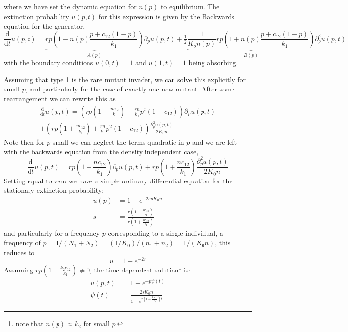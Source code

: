 \documentclass[authoryear,review,11pt]{elsarticle}
\newcommand{\ud}{\mathrm{d}}
\begin{document}
where we have set the dynamic equation for $n(p)$ to equilibrium.  The extinction probability $u(p,t)$ for this expression is given by the Backwards equation for the generator,
\begin{equation}
\frac{\ud}{\ud t} u(p,t) = \underbrace{r p \left(1 -  n(p) \frac{p + c_{12}(1-p) }{k_1 } \right)}_{A(p)} \partial_p u(p,t) + \tfrac{1}{2} \underbrace{\frac{1}{K_o n(p) } r p \left(1 +  n(p)\frac{p + c_{12} (1-p) }{k_1 } \right)}_{B(p)} \partial_p^2 u(p,t) 
\label{u}
\end{equation}
with the boundary conditions $u(0,t) = 1$ and $u(1,t) = 1$ being absorbing.  



Assuming that type 1 is the rare mutant invader, we can solve this explicitly for small $p$, and particularly for the case of exactly one new mutant.  After some rearrangement we can rewrite this as 
\begin{multline}
\frac{\ud}{\ud t} u(p,t) = \left( rp \left( 1-\frac{n c_{12}}{k_1} \right) - \frac{r n}{k_1} p^2 (1 - c_{12} )\right)  \partial_p u(p,t) \\
+ \left( rp \left(1+\frac{n c_{12}}{k_1}\right)  + \frac{r n }{k_1} p^2 (1 - c_{12} ) \right) \frac{\partial_p^2 u(p,t)}{2K_0 n}
\end{multline}
Note then for $p$ small we can neglect the terms quadratic in $p$ and we are left with the backwards equation from the density independent case, 
\begin{equation}
\frac{\ud}{\ud t} u(p,t) =  rp \left( 1-\frac{n c_{12}}{k_1} \right)   \partial_p u(p,t) + rp \left(1+\frac{n c_{12}}{k_1}\right)   \frac{\partial_p^2 u(p,t)}{2K_0 n}
\end{equation}
Setting equal to zero we have a simple ordinary differential equation for the stationary extinction probability:
\begin{align}
u(p) &= 1 - e^{-2sp K_0 n} \\
s &= \frac{r\left( 1-\frac{n c_{12}}{k_1} \right) }{ r\left(1+\frac{n c_{12}}{k_1}\right)} 
\end{align}
and particularly for a frequency $p$ corresponding to a single individual, a frequency of $p=1/(N_1+N_2) =(1/K_0)/(n_1+n_2) = 1/(K_0 n)$, this reduces to
\begin{equation}
u = 1-e^{-2s}
\end{equation}
Assuming $ rp \left( 1-\frac{k_2 c_{12}}{k_1} \right) \neq 0$, the time-dependent solution\footnote{note that $n(p) \approx k_2$ for small $p$.} is:
\begin{align}
u(p,t) &= 1-e^{-p \psi(t) } \\
\psi(t) &= \frac{2 s K_0 n}{1-e^{ r\left( 1-\frac{k_2 c_{12}}{k_1} \right) t } }
\label{timedep}
\end{align}
\end{document}
